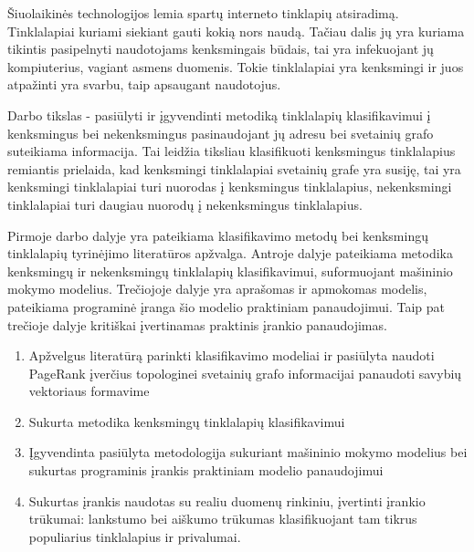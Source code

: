 \documentclass[12pt, a4paper, onecolumn, titlepage, oneside, intlimits]{report}
\begin{document}
\ktuinit{}

\newpage


Šiuolaikinės technologijos lemia spartų interneto tinklapių atsiradimą. Tinklalapiai kuriami siekiant gauti
kokią nors naudą. Tačiau dalis jų yra kuriama tikintis pasipelnyti naudotojams kenksmingais būdais, tai yra
infekuojant jų kompiuterius, vagiant asmens duomenis. Tokie tinklalapiai yra kenksmingi ir juos atpažinti yra
svarbu, taip apsaugant naudotojus.

Darbo tikslas - pasiūlyti ir įgyvendinti metodiką tinklalapių klasifikavimui į kenksmingus bei nekenksmingus
pasinaudojant jų adresu bei svetainių grafo suteikiama informacija. Tai leidžia tiksliau klasifikuoti kenksmingus
tinklalapius remiantis prielaida, kad kenksmingi tinklalapiai svetainių grafe yra susiję, tai yra kenksmingi
tinklalapiai turi nuorodas į kenksmingus tinklalapius, nekenksmingi tinklalapiai turi daugiau nuorodų į nekenksmingus
tinklalapius.

Pirmoje darbo dalyje yra pateikiama klasifikavimo metodų bei kenksmingų tinklalapių tyrinėjimo literatūros apžvalga.
Antroje dalyje pateikiama metodika kenksmingų ir nekenksmingų tinklalapių klasifikavimui, suformuojant mašininio
mokymo modelius. Trečiojoje dalyje yra aprašomas ir apmokomas modelis, pateikiama programinė įranga šio modelio
praktiniam panaudojimui. Taip pat trečioje dalyje kritiškai įvertinamas praktinis įrankio panaudojimas.

\newpage










\newpage




\newpage








\begin{enumerate}[label=\arabic*.]
\item Apžvelgus literatūrą parinkti klasifikavimo modeliai ir pasiūlyta naudoti PageRank
 įverčius topologinei svetainių grafo informacijai panaudoti savybių vektoriaus formavime
\item Sukurta metodika kenksmingų tinklalapių klasifikavimui
\item Įgyvendinta pasiūlyta metodologija sukuriant mašininio mokymo modelius bei sukurtas
 programinis įrankis praktiniam modelio panaudojimui
\item Sukurtas įrankis naudotas su realiu duomenų rinkiniu, įvertinti įrankio trūkumai:
lankstumo bei aiškumo trūkumas klasifikuojant tam tikrus populiarius tinklalapius ir privalumai.
\end{enumerate}
\end{document}
